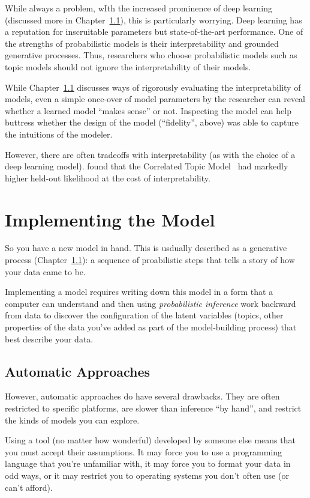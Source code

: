 While always a problem, wIth the increased prominence of deep learning (discussed more in
Chapter~\ref{}), this is particularly worrying.  Deep learning has a
reputation for inscruitable parameters but state-of-the-art
performance.  One of the strengths of probabilistic models is their
interpretability and grounded generative processes.  Thus, researchers who
choose probabilistic models such as topic models should not ignore the
interpretability of their models.

While Chapter~\ref{} discusses ways of rigorously evaluating the
interpretability of models, even a simple once-over of model
parameters by the researcher can reveal whether a learned model
``makes sense'' or not.  Inspecting the model can help buttress
whether the design of the model (``fidelity'', above) was able to
capture the intuitions of the modeler.

However, there are often tradeoffs with interpretability (as with the
choice of a deep learning model).  \citet{} found that the Correlated
Topic Model~\citep{} had markedly higher held-out likelihood at the
cost of interpretability.

\section{Implementing the Model}

So you have a new model in hand.  This is usdually described as a
generative process (Chapter~\ref{}): a sequence of proabilistic steps
that tells a story of how your data came to be.

Implementing a model requires writing down this model in a form that a
computer can understand and then using \emph{probabilistic inference}
work backward from data to discover the configuration of the latent
variables (topics, other properties of the data you've added as part
of the model-building process) that best describe your data.

\subsection{Automatic Approaches}

However, automatic approaches do have several drawbacks.  They are
often restricted to specific platforms, are slower than inference ``by
hand'', and restrict the kinds of models you can explore.

Using a tool (no matter how wonderful) developed by someone else means
that you must accept their assumptions.  It may force you to use a
programming language that you're unfamiliar with, it may force you to
format your data in odd ways, or it may restrict you to operating
systems you don't often use (or can't afford).

